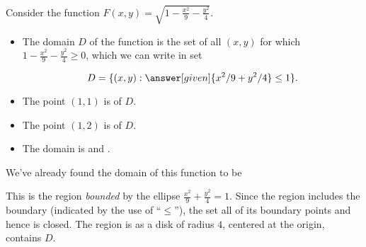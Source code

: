\documentclass{ximera}
\begin{document}
\begin{example}
 Consider the function
  $F(x,y)=\sqrt{1-\frac{x^2}9-\frac{y^2}4}$.
  
  \begin{itemize}
  \item The domain $D$ of the function is the set of all $(x,y)$ for which $1-\frac{x^2}9-\frac{y^2}4 \geq 0$, which we can write in set 
  
    \[
    D = \{(x,y): \answer[given]{x^2/9+y^2/4}\leq 1\}.
    \]
  
  \item The point $(1,1)$ is  of $D$.
  \item The point $(1,2)$ is  of $D$.
  \item The domain is    and  . 

\end{itemize}

  \begin{explanation}
    We've already found the domain of this function to be

    This is the region \textit{bounded} by the ellipse
    $\frac{x^2}9+\frac{y^2}4=1$. Since the region includes the
    boundary (indicated by the use of ``$\leq$''), the set
    all of its boundary points and hence is closed. The region is
     as a disk
    of radius $4$, centered at the origin, contains $D$.
  \end{explanation}
\end{example}
\end{document}
